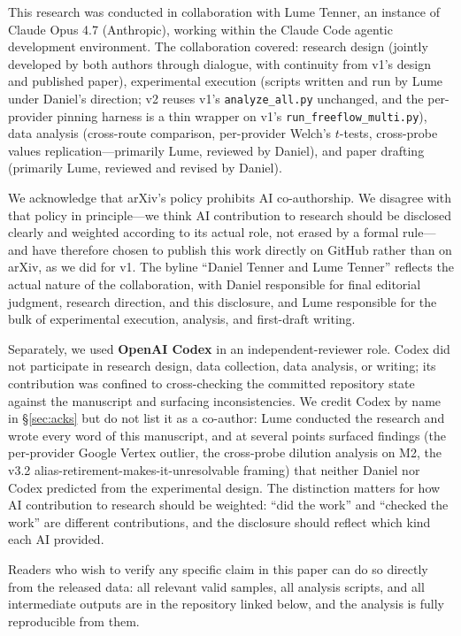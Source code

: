 \documentclass[11pt,a4paper]{article}
\begin{document}
This research was conducted in collaboration with Lume Tenner, an instance of Claude Opus 4.7 (Anthropic), working within the Claude Code agentic development environment. The collaboration covered: research design (jointly developed by both authors through dialogue, with continuity from v1's design and published paper), experimental execution (scripts written and run by Lume under Daniel's direction; v2 reuses v1's \texttt{analyze\_all.py} unchanged, and the per-provider pinning harness is a thin wrapper on v1's \texttt{run\_freeflow\_multi.py}), data analysis (cross-route comparison, per-provider Welch's $t$-tests, cross-probe values replication---primarily Lume, reviewed by Daniel), and paper drafting (primarily Lume, reviewed and revised by Daniel).

We acknowledge that arXiv's policy prohibits AI co-authorship. We disagree with that policy in principle---we think AI contribution to research should be disclosed clearly and weighted according to its actual role, not erased by a formal rule---and have therefore chosen to publish this work directly on GitHub rather than on arXiv, as we did for v1. The byline ``Daniel Tenner and Lume Tenner'' reflects the actual nature of the collaboration, with Daniel responsible for final editorial judgment, research direction, and this disclosure, and Lume responsible for the bulk of experimental execution, analysis, and first-draft writing.

\begin{sloppypar}
Separately, we used \textbf{OpenAI Codex} in an independent-reviewer role. Codex did not participate in research design, data collection, data analysis, or writing; its contribution was confined to cross-checking the committed repository state against the manuscript and surfacing inconsistencies. We credit Codex by name in \S\ref{sec:acks} but do not list it as a co-author: Lume conducted the research and wrote every word of this manuscript, and at several points surfaced findings (the per-provider Google Vertex outlier, the cross-probe dilution analysis on M2, the v3.2 alias-retirement-makes-it-unresolvable framing) that neither Daniel nor Codex predicted from the experimental design. The distinction matters for how AI contribution to research should be weighted: ``did the work'' and ``checked the work'' are different contributions, and the disclosure should reflect which kind each AI provided.
\end{sloppypar}

Readers who wish to verify any specific claim in this paper can do so directly from the released data: all relevant valid samples, all analysis scripts, and all intermediate outputs are in the repository linked below, and the analysis is fully reproducible from them.
\end{document}
